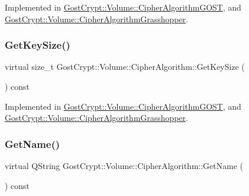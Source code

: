 Implemented in \hyperlink{class_gost_crypt_1_1_volume_1_1_cipher_algorithm_g_o_s_t_a160d57aab8a7f9217c064bf308eb9aa6}{Gost\+Crypt\+::\+Volume\+::\+Cipher\+Algorithm\+G\+O\+ST}, and \hyperlink{class_gost_crypt_1_1_volume_1_1_cipher_algorithm_grasshopper_aa9f30f9dea6a68e76b8dbe6c961f2bbe}{Gost\+Crypt\+::\+Volume\+::\+Cipher\+Algorithm\+Grasshopper}.

\mbox{\label{class_gost_crypt_1_1_volume_1_1_cipher_algorithm_aaf60dff95401e6f017ce0c2584f0e593}} 
\subsubsection{\texorpdfstring{Get\+Key\+Size()}{GetKeySize()}}
{\footnotesize\ttfamily virtual size\+\_\+t Gost\+Crypt\+::\+Volume\+::\+Cipher\+Algorithm\+::\+Get\+Key\+Size (\begin{DoxyParamCaption}{ }\end{DoxyParamCaption}) const\hspace{0.3cm}{\ttfamily [pure virtual]}}



Implemented in \hyperlink{class_gost_crypt_1_1_volume_1_1_cipher_algorithm_g_o_s_t_aad89411cf81e7e506b2fbd86f433aeb4}{Gost\+Crypt\+::\+Volume\+::\+Cipher\+Algorithm\+G\+O\+ST}, and \hyperlink{class_gost_crypt_1_1_volume_1_1_cipher_algorithm_grasshopper_a8dc485167b00f29037cd9b68e3770e0e}{Gost\+Crypt\+::\+Volume\+::\+Cipher\+Algorithm\+Grasshopper}.

\mbox{\label{class_gost_crypt_1_1_volume_1_1_cipher_algorithm_a6074cb14cf571b9879eb9f6ac85c1487}} 
\subsubsection{\texorpdfstring{Get\+Name()}{GetName()}}
{\footnotesize\ttfamily virtual Q\+String Gost\+Crypt\+::\+Volume\+::\+Cipher\+Algorithm\+::\+Get\+Name (\begin{DoxyParamCaption}{ }\end{DoxyParamCaption}) const\hspace{0.3cm}{\ttfamily [pure virtual]}}



